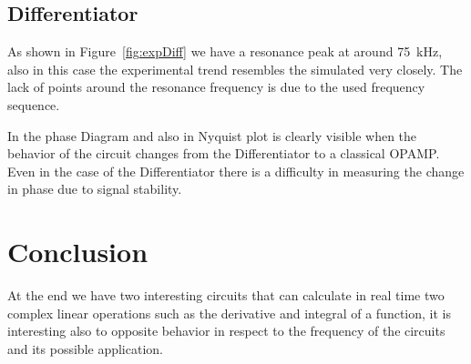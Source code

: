 \documentclass[a4paper, twocolumn]{article}
\begin{document}
\subsection{Differentiator}

As shown in Figure~\ref{fig:expDiff} we have a resonance peak at around \SI{75}{\kilo\hertz}, also in this case the experimental trend resembles the simulated very closely. The lack of points around the resonance frequency is due to the used frequency sequence.

In the phase Diagram and also in Nyquist plot is clearly visible when the behavior of the circuit changes from the Differentiator to a classical OPAMP. Even in the case of the Differentiator there is a difficulty in measuring the change in phase due to signal stability.

\section{Conclusion}

At the end we have two interesting circuits that can calculate in real time two complex linear operations such as the derivative and integral of a function, it is interesting also to opposite behavior in respect to the frequency of the circuits and its possible application.  
\end{document}
